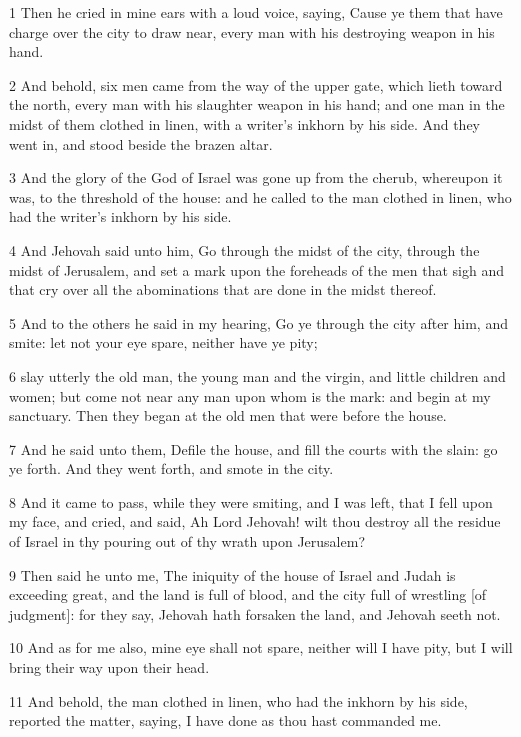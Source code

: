 \par 1 Then he cried in mine ears with a loud voice, saying, Cause ye them that have charge over the city to draw near, every man with his destroying weapon in his hand.
\par 2 And behold, six men came from the way of the upper gate, which lieth toward the north, every man with his slaughter weapon in his hand; and one man in the midst of them clothed in linen, with a writer's inkhorn by his side. And they went in, and stood beside the brazen altar.
\par 3 And the glory of the God of Israel was gone up from the cherub, whereupon it was, to the threshold of the house: and he called to the man clothed in linen, who had the writer's inkhorn by his side.
\par 4 And Jehovah said unto him, Go through the midst of the city, through the midst of Jerusalem, and set a mark upon the foreheads of the men that sigh and that cry over all the abominations that are done in the midst thereof.
\par 5 And to the others he said in my hearing, Go ye through the city after him, and smite: let not your eye spare, neither have ye pity;
\par 6 slay utterly the old man, the young man and the virgin, and little children and women; but come not near any man upon whom is the mark: and begin at my sanctuary. Then they began at the old men that were before the house.
\par 7 And he said unto them, Defile the house, and fill the courts with the slain: go ye forth. And they went forth, and smote in the city.
\par 8 And it came to pass, while they were smiting, and I was left, that I fell upon my face, and cried, and said, Ah Lord Jehovah! wilt thou destroy all the residue of Israel in thy pouring out of thy wrath upon Jerusalem?
\par 9 Then said he unto me, The iniquity of the house of Israel and Judah is exceeding great, and the land is full of blood, and the city full of wrestling [of judgment]: for they say, Jehovah hath forsaken the land, and Jehovah seeth not.
\par 10 And as for me also, mine eye shall not spare, neither will I have pity, but I will bring their way upon their head.
\par 11 And behold, the man clothed in linen, who had the inkhorn by his side, reported the matter, saying, I have done as thou hast commanded me.

